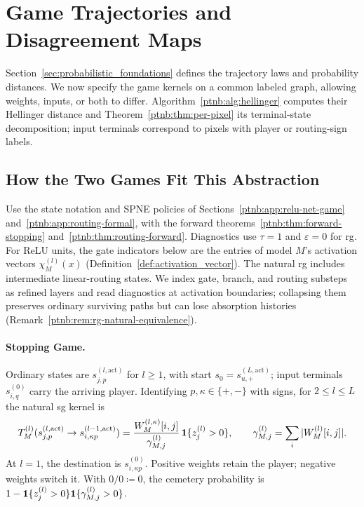 \section{Game Trajectories and Disagreement Maps}\label{sec:trajectory_disagreement}

Section~\ref{sec:probabilistic_foundations} defines the trajectory laws and probability distances. We now specify the game kernels on a common labeled graph, allowing weights, inputs, or both to differ. Algorithm~\ref{ptnb:alg:hellinger} computes their Hellinger distance and Theorem~\ref{ptnb:thm:per-pixel} its terminal-state decomposition; input terminals correspond to pixels with player or routing-sign labels.

\subsection{How the Two Games Fit This Abstraction}\label{ptnb:sec:games-fit}

Use the state notation and SPNE policies of Sections~\ref{ptnb:app:relu-net-game} and~\ref{ptnb:app:routing-formal}, with the forward theorems~\ref{ptnb:thm:forward-stopping} and~\ref{ptnb:thm:routing-forward}. Diagnostics use $\tau=1$ and $\varepsilon=0$ for \ac{rg}. For ReLU units, the gate indicators below are the entries of model $M$'s activation vectors $\chi_M^{(l)}(x)$ (Definition~\ref{def:activation_vector}). The natural \ac{rg} includes intermediate linear-routing states. We index gate, branch, and routing substeps as refined layers and read diagnostics at activation boundaries; collapsing them preserves ordinary surviving paths but can lose absorption histories (Remark~\ref{ptnb:rem:rg-natural-equivalence}).

\paragraph{Stopping Game.}
Ordinary states are $s^{(l,\mathrm{act})}_{j,p}$ for $l\ge1$, with start $s_0=s^{(L,\mathrm{act})}_{u,+}$; input terminals $s^{(0)}_{i,q}$ carry the arriving player. Identifying $p,\kappa\in\{+,-\}$ with signs, for $2\le l\le L$ the natural \ac{sg} kernel is
\begin{equation}\label{ptnb:eq:adf-T}
 T_M^{(l)}(s^{(l,\mathrm{act})}_{j,p}\to s^{(l-1,\mathrm{act})}_{i,\kappa p})
 =\frac{W_M^{(l,\kappa)}[i,j]}{\gamma^{(l)}_{M,j}}\,\mathbf{1}\{z_j^{(l)}>0\},
 \qquad \gamma^{(l)}_{M,j}=\sum_i|W_M^{(l)}[i,j]|.
\end{equation}
At $l=1$, the destination is $s^{(0)}_{i,\kappa p}$. Positive weights retain the player; negative weights switch it. With $0/0\coloneqq0$, the cemetery probability is $1-\mathbf{1}\{z_j^{(l)}>0\}\mathbf{1}\{\gamma^{(l)}_{M,j}>0\}$.

